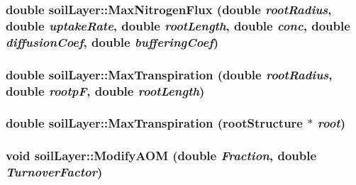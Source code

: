 \label{classsoil_layer_a8d2a6031dcc56ae0c290a9503c192963}
\hypertarget{classsoil_layer_a5685f314f5fc88763799e71fd34b8c75}{
\subsubsection[{MaxNitrogenFlux}]{\setlength{\rightskip}{0pt plus 5cm}double soilLayer::MaxNitrogenFlux (double {\em rootRadius}, \/  double {\em uptakeRate}, \/  double {\em rootLength}, \/  double {\em conc}, \/  double {\em diffusionCoef}, \/  double {\em bufferingCoef})}}
\label{classsoil_layer_a5685f314f5fc88763799e71fd34b8c75}
\hypertarget{classsoil_layer_acb4fdc1a1144da5577b222285bf4f161}{
\subsubsection[{MaxTranspiration}]{\setlength{\rightskip}{0pt plus 5cm}double soilLayer::MaxTranspiration (double {\em rootRadius}, \/  double {\em rootpF}, \/  double {\em rootLength})}}
\label{classsoil_layer_acb4fdc1a1144da5577b222285bf4f161}
\hypertarget{classsoil_layer_aaa3df5650bfb89fe57e853d34680b887}{
\subsubsection[{MaxTranspiration}]{\setlength{\rightskip}{0pt plus 5cm}double soilLayer::MaxTranspiration ({\bf rootStructure} $\ast$ {\em root})}}
\label{classsoil_layer_aaa3df5650bfb89fe57e853d34680b887}
\hypertarget{classsoil_layer_a7d58b327ed2900ba76920934d1802da2}{
\subsubsection[{ModifyAOM}]{\setlength{\rightskip}{0pt plus 5cm}void soilLayer::ModifyAOM (double {\em Fraction}, \/  double {\em TurnoverFactor})}}

